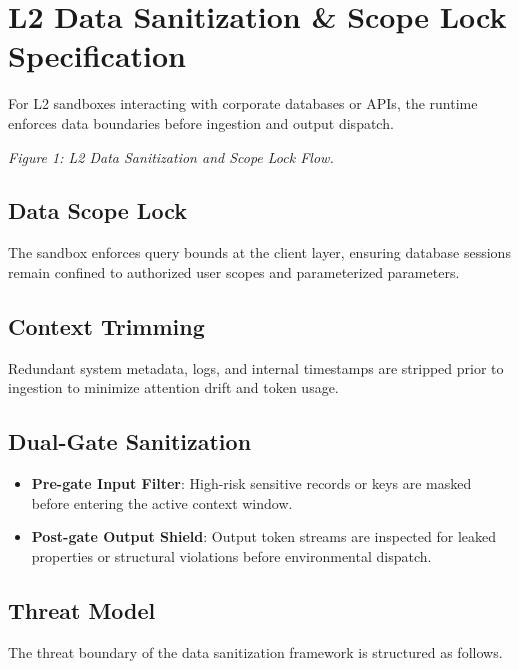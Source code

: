 \documentclass[10pt,journal,compsoc]{IEEEtran}
\begin{document}
\section{L2 Data Sanitization \& Scope Lock Specification}
For L2 sandboxes interacting with corporate databases or APIs, the runtime enforces data boundaries before ingestion and output dispatch.


\textit{Figure 1: L2 Data Sanitization and Scope Lock Flow.}

\subsection{Data Scope Lock}
The sandbox enforces query bounds at the client layer, ensuring database sessions remain confined to authorized user scopes and parameterized parameters.

\subsection{Context Trimming}
Redundant system metadata, logs, and internal timestamps are stripped prior to ingestion to minimize attention drift and token usage.

\subsection{Dual-Gate Sanitization}
\begin{itemize}
  \item \textbf{Pre-gate Input Filter}: High-risk sensitive records or keys are masked before entering the active context window.
  \item \textbf{Post-gate Output Shield}: Output token streams are inspected for leaked properties or structural violations before environmental dispatch.
\end{itemize}

\subsection{Threat Model}

The threat boundary of the data sanitization framework is structured as follows.
\end{document}
